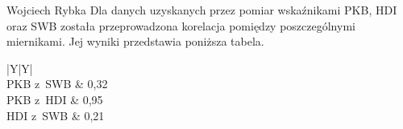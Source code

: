 \begin{artplenv}{Wojciech Rybka}
Dla danych uzyskanych przez pomiar wskaźnikami PKB, HDI oraz SWB została przeprowadzona korelacja pomiędzy
poszczególnymi miernikami. Jej wyniki przedstawia poniższa tabela.

\captionsetup[table]{name=Tabela}
\begin{table}[H]
	\begin{tabularx}{\textwidth}{|Y|Y|}
		\hline
		\\\hline
		PKB z~SWB &
		0,32\\\hline
		PKB z~HDI &
		0,95\\\hline
		HDI z~SWB &
		0,21\\\hline
	\end{tabularx}
	
	\caption{Wartości związku pomiędzy poszczególnymi wskaźnikami dla Polski.
		Źródło: opracowanie własne na podstawie
		\parencite{international_monetary_fund_world_2019a,united_nations_development_programme_human_2019,noauthor_world_2018}.
		}
	\label{tab3:ryb}
\end{table}


%



\end{artplenv}
